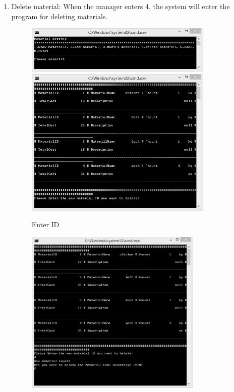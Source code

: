 \documentclass{article}
\begin{document}
\begin{enumerate}
    \item Delete material:\newline 
    When the manager enters 4, the system will enter the program for deleting materials. 
        \begin{figure}[H]
        \centering
        \includegraphics[width=0.85\textwidth]{E/E4a.jpg}
        \includegraphics[width=0.85\textwidth]{E/E4b0.jpg}
        \caption{Enter ID}
        \end{figure}
        \begin{figure}[H]
        \centering
        \includegraphics[width=0.8\textwidth]{E/E4b1b.jpg}

\end{figure}
\end{enumerate}
\end{document}

